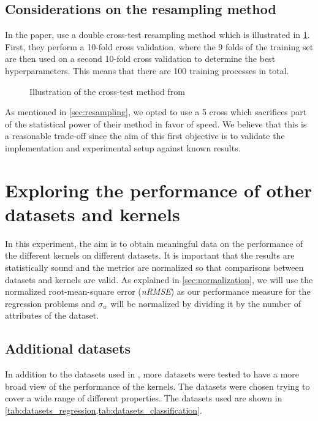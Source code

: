 \subsection{Considerations on the resampling method}%
\label{sec:considerations-on-the-resampling-method}

In the paper, \citeauthor{frenayParameterinsensitiveKernelExtreme2011} use a
double cross-test resampling method which is illustrated in
\cref{fig:frenay-cross-test}. First, they perform a 10-fold cross validation,
where the 9 folds of the training set are then used on a second 10-fold cross
validation to determine the best hyperparameters. This means that there are 100
training processes in total.

\begin{figure}[H]
    
    \caption{Illustration of the cross-test method from \cite{frenayParameterinsensitiveKernelExtreme2011}}
    \label{fig:frenay-cross-test}
\end{figure}

As mentioned in \cref{sec:resampling}, we opted to use a 5 cross
which sacrifices part of the statistical power of their method in favor of
speed. We believe that this is a reasonable trade-off since the aim of this
first objective is to validate the implementation and experimental setup against
known results.

\section{Exploring the performance of other datasets and kernels}%
\label{sec:exploring-the-performance-of-other-datasets-and-kernels}

In this experiment, the aim is to obtain meaningful data on the performance of
the different kernels on different datasets. It is important that the results
are statistically sound and the metrics are normalized so that comparisons
between datasets and kernels are valid. As explained in \cref{sec:normalization}, we
will use the normalized root-mean-square error (\emph{nRMSE}) as our performance
measure for the regression problems and $\sigma_w$ will be normalized by
dividing it by the number of attributes of the dataset.

\subsection{Additional datasets}%

In addition to the datasets used in \cite{frenayParameterinsensitiveKernelExtreme2011},
more datasets were tested to have a more broad view of the performance of the
kernels. The datasets were chosen trying to cover a wide range of different
properties. The datasets used are shown in \cref{tab:datasets_regression,tab:datasets_classification}.

